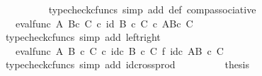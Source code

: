 \begin{isabellebody}
\ \ \ \ \ \ \ \ \isamarkupfalse%
\ {\isacharparenleft}{\kern0pt}typecheck{\isacharunderscore}{\kern0pt}cfuncs{\isacharcomma}{\kern0pt}\ simp\ add{\isacharcolon}{\kern0pt}\ {\isasymphi}{\isacharunderscore}{\kern0pt}def\ comp{\isacharunderscore}{\kern0pt}associative{}{\isacharparenright}{\kern0pt}\ \ \isanewline
\ \ \ \ \ \ \isamarkupfalse%
\ \isamarkupfalse%
\ {\isachardoublequoteopen}{\isachardot}{\kern0pt}{\isachardot}{\kern0pt}{\isachardot}{\kern0pt}\ {\isacharequal}{\kern0pt}\ eval{\isacharunderscore}{\kern0pt}func\ A\ {\isacharparenleft}{\kern0pt}B{\isasymtimes}\isactrlsub c\ C{\isacharparenright}{\kern0pt}\ {\isasymcirc}\isactrlsub c\ id\ {\isacharparenleft}{\kern0pt}{\isacharparenleft}{\kern0pt}B\ {\isasymtimes}\isactrlsub c\ C{\isacharparenright}{\kern0pt}\ {\isasymtimes}\isactrlsub c\ {\isacharparenleft}{\kern0pt}A\isactrlbsup {\isacharparenleft}{\kern0pt}B{\isasymtimes}\isactrlsub c\ C{\isacharparenright}{\kern0pt}\isactrlesup {\isacharparenright}{\kern0pt}{\isacharparenright}{\kern0pt}{\isachardoublequoteclose}\isanewline
\ \ \ \ \ \ \ \ \isamarkupfalse%
\ {\isacharparenleft}{\kern0pt}typecheck{\isacharunderscore}{\kern0pt}cfuncs{\isacharcomma}{\kern0pt}\ simp\ add{\isacharcolon}{\kern0pt}\ left{\isacharunderscore}{\kern0pt}right{\isacharparenright}{\kern0pt}\isanewline
\ \ \ \ \ \ \isamarkupfalse%
\ \isamarkupfalse%
\ {\isachardoublequoteopen}{\isachardot}{\kern0pt}{\isachardot}{\kern0pt}{\isachardot}{\kern0pt}\ {\isacharequal}{\kern0pt}\ eval{\isacharunderscore}{\kern0pt}func\ A\ {\isacharparenleft}{\kern0pt}B\ {\isasymtimes}\isactrlsub c\ C{\isacharparenright}{\kern0pt}\ {\isasymcirc}\isactrlsub c\ id\isactrlsub c\ {\isacharparenleft}{\kern0pt}B\ {\isasymtimes}\isactrlsub c\ C{\isacharparenright}{\kern0pt}\ {\isasymtimes}\isactrlsub f\ id\isactrlsub c\ {\isacharparenleft}{\kern0pt}A\isactrlbsup {\isacharparenleft}{\kern0pt}B\ {\isasymtimes}\isactrlsub c\ C{\isacharparenright}{\kern0pt}\isactrlesup {\isacharparenright}{\kern0pt}{\isachardoublequoteclose}\isanewline
\ \ \ \ \ \ \ \ \isamarkupfalse%
\ {\isacharparenleft}{\kern0pt}typecheck{\isacharunderscore}{\kern0pt}cfuncs{\isacharcomma}{\kern0pt}\ simp\ add{\isacharcolon}{\kern0pt}\ id{\isacharunderscore}{\kern0pt}cross{\isacharunderscore}{\kern0pt}prod{\isacharparenright}{\kern0pt}\isanewline
\ \ \ \ \ \ \isamarkupfalse%
\ \isamarkupfalse%
\ {\isacharquery}{\kern0pt}thesis\isacommand{{\isachardot}{\kern0pt}}\isamarkupfalse%
\isanewline

\end{isabellebody}
